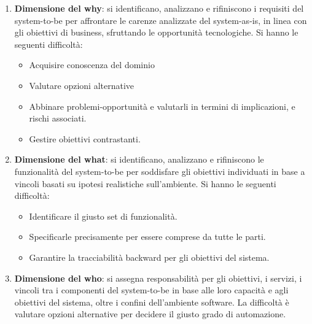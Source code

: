 \begin{enumerate}
      \item \textbf{Dimensione del why}: si identificano, analizzano e rifiniscono
            i requisiti del system-to-be per affrontare le carenze analizzate del
            system-as-is, in linea con gli obiettivi di business, sfruttando le opportunità
            tecnologiche. Si hanno le seguenti difficoltà:
            \begin{itemize}
                  \item Acquisire conoscenza del dominio
                  \item Valutare opzioni alternative
                  \item Abbinare problemi-opportunità e valutarli in termini di implicazioni,
                        e rischi associati.
                  \item Gestire obiettivi contrastanti.
            \end{itemize}
      \item \textbf{Dimensione del what}: si identificano, analizzano e rifiniscono
            le funzionalità del system-to-be per soddisfare gli obiettivi individuati in
            base a vincoli basati su ipotesi realistiche sull'ambiente. Si hanno le seguenti difficoltà:
            \begin{itemize}
                  \item Identificare il giusto set di funzionalità.
                  \item Specificarle precisamente per essere comprese da tutte le parti.
                  \item Garantire la tracciabilità backward per gli obiettivi del sistema.
            \end{itemize}
      \item \textbf{Dimensione del who}: si assegna responsabilità per gli obiettivi,
            i servizi, i vincoli tra i componenti del system-to-be in base alle loro
            capacità e agli obiettivi del sistema, oltre i confini dell'ambiente software.
            La difficoltà è valutare opzioni alternative per decidere il giusto grado
            di automazione.
\end{enumerate}

